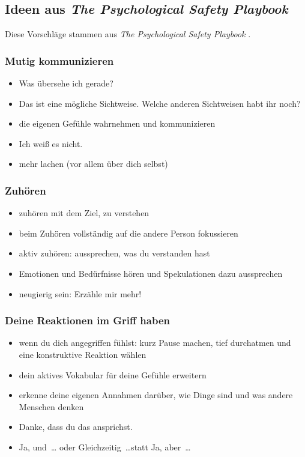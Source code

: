 \subsection{Ideen aus \emph{The Psychological Safety Playbook}}

Diese Vorschläge stammen aus \emph{The Psychological Safety Playbook} \cite{psychological-safety-playbook}.


\subsubsection{Mutig kommunizieren}

\begin{itemize}
  \item \glqq Was übersehe ich gerade?\grqq
  \item \glqq Das ist eine mögliche Sichtweise. Welche anderen Sichtweisen habt ihr noch?\grqq
  \item die eigenen Gefühle wahrnehmen und kommunizieren
  \item \glqq Ich weiß es nicht.\grqq
  \item mehr lachen (vor allem über dich selbst)
\end{itemize}



\subsubsection{Zuhören}

\begin{itemize}
  \item zuhören mit dem Ziel, zu verstehen
  \item beim Zuhören vollständig auf die andere Person fokussieren
  \item aktiv zuhören: aussprechen, was du verstanden hast
  \item Emotionen und Bedürfnisse hören und Spekulationen dazu aussprechen
  \item neugierig sein: \glqq Erzähle mir mehr!\grqq
\end{itemize}


\subsubsection{Deine Reaktionen im Griff haben}

\begin{itemize}
  \item wenn du dich angegriffen fühlst: kurz Pause machen, tief durchatmen und eine konstruktive Reaktion wählen
  \item dein aktives Vokabular für deine Gefühle erweitern
  \item erkenne deine eigenen Annahmen darüber, wie Dinge sind und was andere Menschen denken
  \item \glqq Danke, dass du das ansprichst.\grqq
  \item \glqq Ja, und~\ldots\grqq{} oder \glqq Gleichzeitig~\ldots\grqq statt \glqq Ja, aber~\ldots\grqq
\end{itemize}


